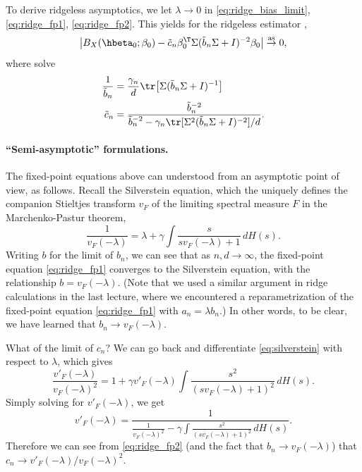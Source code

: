 \documentclass{article}
\begin{document}
To derive ridgeless asymptotics, we let $\lambda \to 0$ in
\eqref{eq:ridge_bias_limit}, \eqref{eq:ridge_fp1}, \eqref{eq:ridge_fp2}. 
This yields for the ridgeless estimator ,   
\begin{equation}
\label{eq:ridgeless_bias_limit}
\big| B_X(\hbeta_0; \beta_0) - \tilde{c}_n \beta_0^\T \Sigma (\tilde{b}_n 
\Sigma + I)^{-2} \beta_0 \big| \asto 0,  
\end{equation}
where  solve
\begin{align}
\label{eq:ridgeless_fp1}
\frac{1}{\tilde{b}_n} &= \frac{\gamma_n}{d} \tr \big[ \Sigma (\tilde{b}_n
  \Sigma + I)^{-1} \big]\\  
\label{eq:ridgeless_fp2}
\tilde{c}_n &= \frac{\tilde{b}_n^{-2}}{\tilde{b}_n^{-2} - \gamma_n \tr [
  \Sigma^2 (\tilde{b}_n \Sigma + I)^{-2} ] / d}.  
\end{align}

\paragraph{``Semi-asymptotic'' formulations.} 

The fixed-point equations above can understood from an asymptotic point of view, 
as follows. Recall the Silverstein equation, which the uniquely defines the
companion Stieltjes transform $v_F$ of the limiting spectral measure $F$ in the
Marchenko-Pastur theorem,  
\begin{equation}
\label{eq:silverstein}
\frac{1}{v_F(-\lambda)} = \lambda + \gamma \int \frac{s}{s v_F(-\lambda) + 1} \,
dH(s).  
\end{equation}
Writing $b$ for the limit of $b_n$, we can see that as $n,d \to \infty$,
the fixed-point equation \eqref{eq:ridge_fp1} converges to the Silverstein
equation, with the relationship $b = v_F(-\lambda)$. (Note that we used a 
similar argument in ridge calculations in the last lecture, where we encountered
a reparametrization of the fixed-point equation \eqref{eq:ridge_fp1} with $a_n =  
\lambda b_n$.) In other words, to be clear, we have learned that $b_n \to
v_F(-\lambda)$.

What of the limit of $c_n$? We can go back and differentiate 
\eqref{eq:silverstein} with respect to $\lambda$, which gives
\[
\frac{v'_F(-\lambda)}{v_F(-\lambda)^2} = 1 + \gamma v'_F(-\lambda) \int
\frac{s^2}{(s v_F(-\lambda) + 1)^2} \, dH(s).
\]
Simply solving for $v'_F(-\lambda)$, we get 
\[
v'_F(-\lambda) = \frac{1}{\frac{1}{v_F(-\lambda)^2} - \gamma \int \frac{s^2}{(s 
    v_F(-\lambda) + 1)^2} \, dH(s)}. 
\]
Therefore we can see from \eqref{eq:ridge_fp2} (and the fact that $b_n \to
v_F(-\lambda)$) that $c_n \to v'_F(-\lambda) / v_F(-\lambda)^2$. 
\end{document}

